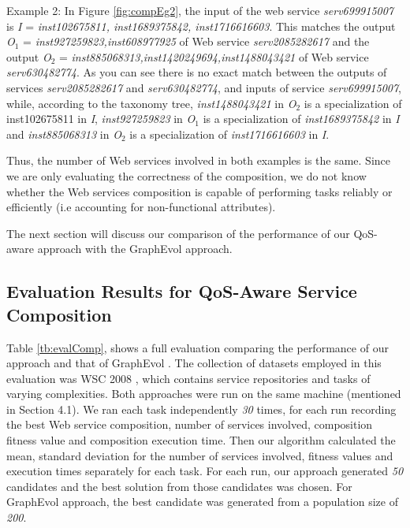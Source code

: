 Example 2:  In Figure \ref{fig:compEg2},  the input of the web service \emph{serv699915007} is \emph{I} = \emph{{inst102675811, inst1689375842, inst1716616603}}. This matches the output \emph{O$_1$} = \emph{{inst927259823,inst608977925 }} of Web service  \emph{serv2085282617} and the output \emph{O$_2$} = \emph{{inst885068313,inst1420249694,inst1488043421 }} of Web service  \emph{serv630482774}. As you can see there is no exact match between the outputs of services \emph{serv2085282617} and \emph{serv630482774}, and inputs of service \emph{serv699915007}, while, according to the taxonomy tree, \emph{inst1488043421} in \emph{O$_2$} is a specialization of inst102675811 in \emph{I}, \emph{inst927259823} in \emph{O$_1$} is a specialization of \emph{inst1689375842} in \emph{I} and  \emph{inst885068313} in \emph{O$_2$} is a specialization of \emph{inst1716616603} in \emph{I}.\par

Thus, the number of Web services involved in both examples is the same. Since we are only evaluating the correctness of the composition, we do not know whether the Web services composition is capable of performing tasks reliably or efficiently (i.e accounting for non-functional attributes).\par

The next section will discuss our comparison of the performance of our QoS-aware approach with the GraphEvol approach.\par

\subsection{Evaluation Results for QoS-Aware Service Composition} 
Table \ref{tb:evalComp},  shows a full evaluation comparing the performance of our approach and that of GraphEvol \cite{2}. The collection of datasets employed in this evaluation was WSC 2008 \cite{12}, which contains service repositories and tasks of varying complexities. Both approaches were run on the same machine (mentioned in Section 4.1).  We ran each task independently \emph{30} times, for each run recording the best Web service composition, number of services involved, composition fitness value and composition execution time. Then our algorithm calculated the mean, standard deviation for the number of services involved, fitness values and execution times separately for each task. For each run, our approach generated \emph{50} candidates and the best solution from those candidates was chosen. For GraphEvol approach, the best candidate was generated from a population size of \emph{200}.\par

